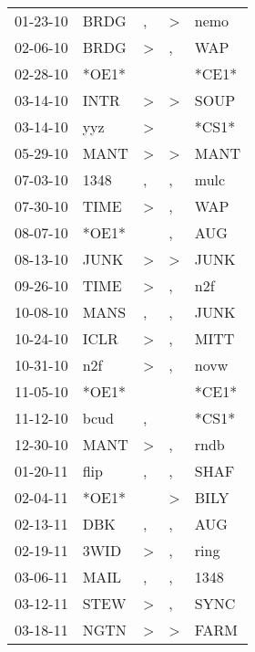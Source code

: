 \begin{supertabular}{lllll}
 01-23-10 &   BRDG &                , &     \textgreater &   nemo \\
 02-06-10 &   BRDG &     \textgreater &                , &    WAP \\
 02-28-10 &  *OE1* &                  &                  &  *CE1* \\
 03-14-10 &   INTR &     \textgreater &     \textgreater &   SOUP \\
 03-14-10 &    yyz &     \textgreater &                  &  *CS1* \\
 05-29-10 &   MANT &     \textgreater &     \textgreater &   MANT \\
 07-03-10 &   1348 &                , &                , &   mulc \\
 07-30-10 &   TIME &     \textgreater &                , &    WAP \\
 08-07-10 &  *OE1* &                  &                , &    AUG \\
 08-13-10 &   JUNK &     \textgreater &     \textgreater &   JUNK \\
 09-26-10 &   TIME &     \textgreater &                , &    n2f \\
 10-08-10 &   MANS &                , &                , &   JUNK \\
 10-24-10 &   ICLR &     \textgreater &                , &   MITT \\
 10-31-10 &    n2f &     \textgreater &                , &   novw \\
 11-05-10 &  *OE1* &                  &                  &  *CE1* \\
 11-12-10 &   bcud &                , &                  &  *CS1* \\
 12-30-10 &   MANT &     \textgreater &                , &   rndb \\
 01-20-11 &   flip &                , &                , &   SHAF \\
 02-04-11 &  *OE1* &                  &     \textgreater &   BILY \\
 02-13-11 &    DBK &                , &                , &    AUG \\
 02-19-11 &   3WID &     \textgreater &                , &   ring \\
 03-06-11 &   MAIL &                , &                , &   1348 \\
 03-12-11 &   STEW &     \textgreater &                , &   SYNC \\
 03-18-11 &   NGTN &     \textgreater &     \textgreater &   FARM \\

\end{supertabular}
